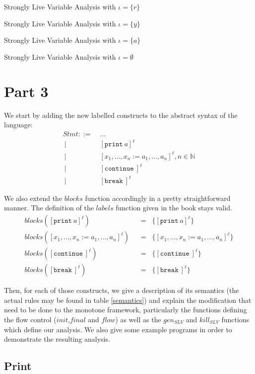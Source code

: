 \documentclass[a4wide,12pt]{article}
\def\eq{\;\; = \;\;}
\def\N{\mathbb{N}}
\def\print{\texttt{print}\ }
\def\cont {\texttt{continue}\ }
\def\break{\texttt{break}\ }
\def\restabR#1#2{\begin{table}\begin{center}\caption{#1}\begin{sideways}\end{sideways}\end{center}\end{table}}
\def\restab#1#2{\begin{table}\begin{center}\caption{#1}\end{center}\end{table}}
\begin{document}
\restabR{Strongly Live Variable Analysis with $\iota = \{r\}$}{resultr.tex}

\restab{Strongly Live Variable Analysis with $\iota = \{y\}$}{resulty.tex}

\restab{Strongly Live Variable Analysis with $\iota = \{a\}$}{resulta.tex}

\restab{Strongly Live Variable Analysis with $\iota = \emptyset$}{resultempty.tex}
 
\section{Part 3}
 
We start by adding the new labelled constructs to the abstract syntax of the language:
\begin{align*}
 Stmt ::= \; & \ldots \\
 ~ |\;\; & [\print a]^\ell \\
 ~ |\;\; & [x_1,\ldots,x_n := a_1,\ldots,a_n]^\ell , n \in \N \\
 ~ |\;\; & [\cont]^\ell \\
 ~ |\;\; & [\break]^\ell
\end{align*}
 
We also extend the $blocks$ function accordingly in a pretty straightforward manner. The definition
of the $labels$ function given in the book stays valid.
\begin{align*}
 blocks([\print a]^\ell) & \eq \{[\print a]^\ell\} \\
 blocks([x_1,\ldots,x_n := a_1,\ldots,a_n]^\ell) & \eq \{[x_1,\ldots,x_n := a_1,\ldots,a_n]^\ell\} \\
 blocks([\cont]^\ell) & \eq \{[\cont]^\ell\} \\
 blocks([\break]^\ell) & \eq \{[\break]^\ell\}
\end{align*}
 
 
Then, for each of those constructs, we give a description of its semantics (the actual rules may be found
in table \ref{semantics}) and explain the modification that need to be done
to the monotone framework, particularly the functions defining the flow control
($init$,$final$ and $flow$) as well as the $gen_{SLV}$ and $kill_{SLV}$ functions
which define our analysis. We also give some example
programs in order to demonstrate the resulting analysis.
 
\subsection{Print}
 
\end{document}

